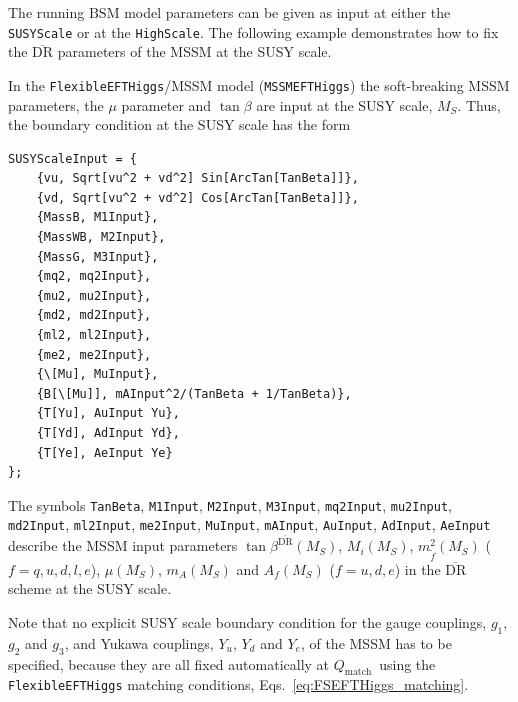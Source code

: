 \documentclass[final,3p,11pt,pdflatex]{elsarticle}
\makeatletter
\newcommand{\feft}{\texttt{Flex\-ib\-le\-EFT\-Higgs}\@\xspace}
\newcommand{\code}[1]{\lstinline|#1|}  %
\newcommand{\ol}[1]{\overline{#1}}
\newcommand{\DRbar}{\ensuremath{\ol{\text{DR}}}\xspace}
\newcommand{\BSM}{\ensuremath{\text{BSM}}\xspace}
\newcommand{\MS}{\ensuremath{M_S}\xspace}
\newcommand{\Qmatch}{\ensuremath{Q_\text{match}}}
\makeatother
\begin{document}
The running \BSM model parameters can be given as input at either the
\code{SUSYScale} or at the \code{HighScale}.  The following example
demonstrates how to fix the \DRbar parameters of the MSSM at the SUSY
scale.
%
\begin{example}[label=ex:MSSMEFTHiggs]
In the \feft/MSSM model (\code{MSSMEFTHiggs})
the soft-breaking MSSM parameters, the $\mu$ parameter and $\tan\beta$
are input at the SUSY scale, \MS.  Thus, the boundary condition at the SUSY
scale has the form
%
\begin{lstlisting}
SUSYScaleInput = {
    {vu, Sqrt[vu^2 + vd^2] Sin[ArcTan[TanBeta]]},
    {vd, Sqrt[vu^2 + vd^2] Cos[ArcTan[TanBeta]]},
    {MassB, M1Input},
    {MassWB, M2Input},
    {MassG, M3Input},
    {mq2, mq2Input},
    {mu2, mu2Input},
    {md2, md2Input},
    {ml2, ml2Input},
    {me2, me2Input},
    {\[Mu], MuInput},
    {B[\[Mu]], mAInput^2/(TanBeta + 1/TanBeta)},
    {T[Yu], AuInput Yu},
    {T[Yd], AdInput Yd},
    {T[Ye], AeInput Ye}
};
\end{lstlisting}
%
The symbols \code{TanBeta}, \code{M1Input}, \code{M2Input},
\code{M3Input}, \code{mq2Input}, \code{mu2Input}, \code{md2Input},
\code{ml2Input}, \code{me2Input}, \code{MuInput}, \code{mAInput},
\code{AuInput}, \code{AdInput}, \code{AeInput} describe the MSSM input
parameters $\tan\beta^{\DRbar}(\MS)$, $M_i(\MS)$, $m_{\tilde{f}}^2(\MS)$
($f=q,u,d,l,e$), $\mu(\MS)$, $m_A(\MS)$ and $A_f(\MS)$
($f=u,d,e$) in the \DRbar scheme at the SUSY scale.

Note that no explicit SUSY scale boundary condition for the gauge
couplings, $g_1$, $g_2$ and $g_3$, and Yukawa couplings, $Y_u$, $Y_d$
and $Y_e$, of the MSSM has to be specified, because they are all fixed
automatically at \Qmatch\ using the \feft matching conditions, Eqs.\
\eqref{eq:FSEFTHiggs_matching}.


\end{example}
\end{document}
